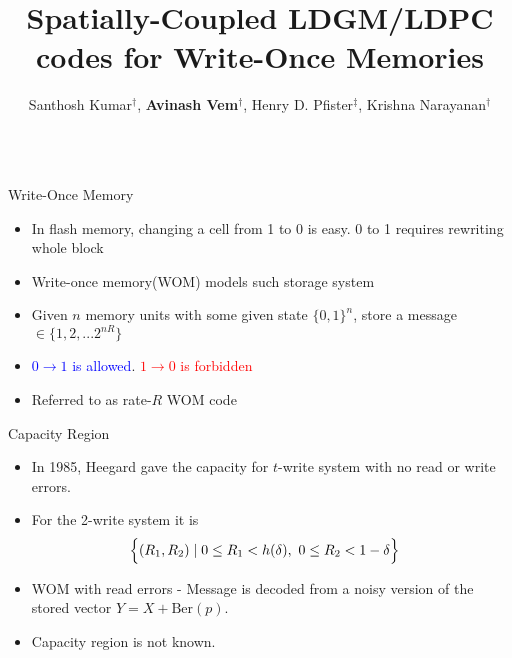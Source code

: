 \documentclass{beamer}
\title{\LARGE Spatially-Coupled LDGM/LDPC codes for Write-Once Memories}
\author{Santhosh Kumar$^{\dagger}$, \textbf{Avinash Vem}$^{\dagger}$, Henry D. Pfister$^{\ddagger}$, Krishna Narayanan$^{\dagger}$}
\institute{Texas A\&M University$^{\dagger}$, Duke University$^{\ddagger}$}
\newlength{\onecolwid}
\newlength{\itemspace}
\begin{document}
\begin{frame}
\begin{columns}[t]
  \begin{column}{\onecolwid}

    \vspace{0.25cm}  
    \begin{block}{\Large Write-Once Memory}
      \begin{itemize}
      \item\vspace{\itemspace}  In flash memory, changing a cell from 1 to 0 is easy. 0 to 1 requires rewriting whole block
      \item\vspace{\itemspace}  Write-once memory(WOM) models such storage system
      \item\vspace{\itemspace}   Given $n$ memory units with some given state $\{0,1\}^n$, store a message $\in \{1,2,...2^{nR}\}$
      \item\vspace{\itemspace}  \textcolor{blue}{$0 \longrightarrow 1$ is allowed}. \textcolor{red}{$1 \longrightarrow 0$ is forbidden}
      \item\vspace{\itemspace}  Referred to as rate-$R$ WOM code
      \end{itemize}
    \end{block}

    \vspace{2cm}
    \begin{block}{\Large Capacity Region}
%        
      \begin{itemize}
      \item \vspace{\itemspace} In 1985, Heegard gave the capacity for $t$-write system with no read or write errors.
      \item \vspace{\itemspace} For the 2-write system it is 
            \begin{align*}
        & \Big{\{} (R_1,R_2) \mid 0 \leq R_1 <  h(\delta) , \,\,0 \leq R_2 < 1-\delta \Big{\}} 
      \end{align*}
      \item \vspace{\itemspace} WOM with read errors - Message is decoded from a noisy version of the stored vector $Y=X+\text{Ber}(p)$.
      \item \vspace{\itemspace} Capacity region is not known.
      \end{itemize}
    \end{block}


\end{column}
\end{columns}
\end{frame}
\end{document}
